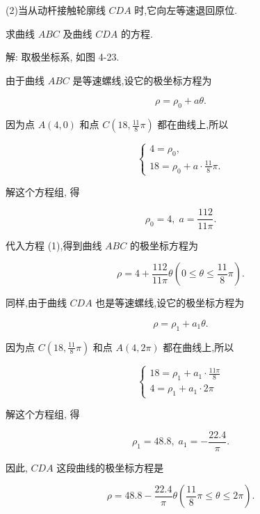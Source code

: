 \documentclass[lang=cn,newtx,12pt,scheme=chinese]{elegantbook}
\begin{document}
(2)当从动杆接触轮廓线 \({CDA}\) 时,它向左等速退回原位.

求曲线 \({ABC}\) 及曲线 \({CDA}\) 的方程.

解: 取极坐标系, 如图 4-23.

由于曲线 \({ABC}\) 是等速螺线,设它的极坐标方程为

\[
  \rho = {\rho }_{0} + {a\theta }. \tag{1}
\]

因为点 \(A\left( {4,0}\right)\) 和点 \(C\left( {{18},\frac{11}{8}\pi }\right)\) 都在曲线上,所以

\[
  \left\{ \begin{array}{l} 4 = {\rho }_{0}, \\ {18} = {\rho }_{0} + a \cdot \frac{11}{8}\pi . \end{array}\right.
\]

解这个方程组, 得

\[
    {\rho }_{0} = 4,\;a = \frac{112}{11\pi }.
\]

代入方程 (1),得到曲线 \({ABC}\) 的极坐标方程为

\[
  \rho = 4 + \frac{112}{11\pi }\theta \left( {0 \leq \theta \leq \frac{11}{8}\pi }\right) .
\]

同样,由于曲线 \({CDA}\) 也是等速螺线,设它的极坐标方程为

\[
  \rho = {\rho }_{1} + {a}_{1}\theta . \tag{2}
\]

因为点 \(C\left( {{18},\frac{11}{8}\pi }\right)\) 和点 \(A\left( {4,{2\pi }}\right)\) 都在曲线上,所以

\[
  \left\{ \begin{array}{l} {18} = {\rho }_{1} + {a}_{1} \cdot \frac{11\pi }{8} \\ 4 = {\rho }_{1} + {a}_{1} \cdot {2\pi } \end{array}\right.
\]

解这个方程组, 得

\[
    {\rho }_{1} = {48.8},\;{a}_{1} = - \frac{22.4}{\pi }.
\]

因此, \({CDA}\) 这段曲线的极坐标方程是

\[
  \rho = {48.8} - \frac{22.4}{\pi }\theta \left( {\frac{11}{8}\pi \leq \theta \leq {2\pi }}\right) .
\]
\end{document}
